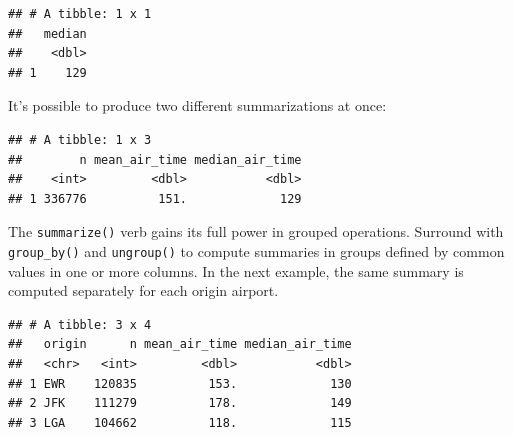 \documentclass[]{book}
\newenvironment{Shaded}{}{}
\newcommand{\DataTypeTok}[1]{#1}
\newcommand{\KeywordTok}[1]{\textcolor[rgb]{0.00,0.00,1.00}{#1}}
\newcommand{\NormalTok}[1]{#1}
\newcommand{\OperatorTok}[1]{#1}
\newcommand{\OtherTok}[1]{\textcolor[rgb]{1.00,0.25,0.00}{#1}}
\newcommand{\StringTok}[1]{\textcolor[rgb]{0.00,0.50,0.50}{#1}}
\begin{document}
\begin{verbatim}
## # A tibble: 1 x 1
##   median
##    <dbl>
## 1    129
\end{verbatim}

It's possible to produce two different summarizations at once:

\begin{Shaded}
\end{Shaded}

\begin{verbatim}
## # A tibble: 1 x 3
##        n mean_air_time median_air_time
##    <int>         <dbl>           <dbl>
## 1 336776          151.             129
\end{verbatim}

The \texttt{summarize()} verb gains its full power in grouped operations.
Surround with \texttt{group\_by()} and \texttt{ungroup()} to compute summaries in groups defined by common values in one or more columns.
In the next example, the same summary is computed separately for each origin airport.

\begin{Shaded}
\end{Shaded}

\begin{verbatim}
## # A tibble: 3 x 4
##   origin      n mean_air_time median_air_time
##   <chr>   <int>         <dbl>           <dbl>
## 1 EWR    120835          153.             130
## 2 JFK    111279          178.             149
## 3 LGA    104662          118.             115
\end{verbatim}
\end{document}
